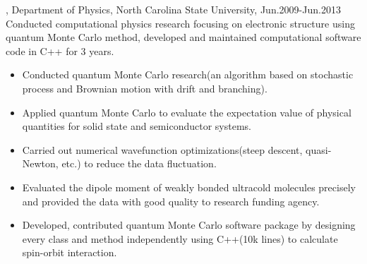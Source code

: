 \documentclass[11pt]{article} %
\begin{document}
, Department of Physics, North Carolina State University, Jun.2009-Jun.2013\\
\noindent Conducted computational physics research focusing on electronic structure using quantum Monte Carlo method, developed and maintained computational software code in C++ for 3 years.\\
\begin{itemize}
 \item Conducted quantum Monte Carlo research(an algorithm based on stochastic process and Brownian motion with drift and branching).\\
\vspace{-4mm}
  \item Applied quantum Monte Carlo to evaluate the expectation value of physical quantities for solid state and semiconductor systems. \\

\vspace{-4mm}
  \item Carried out numerical wavefunction optimizations(steep descent, quasi-Newton, etc.) to reduce the data fluctuation. \\
  \vspace{-4mm}
  \item Evaluated the dipole moment of weakly bonded ultracold molecules precisely and  provided
the data with good quality to research funding agency.\\
\vspace{-4mm}
  \item Developed, contributed quantum Monte Carlo software package by designing every class and method independently using C++(10k lines) to calculate spin-orbit interaction.\\




\end{itemize}
\end{document}
